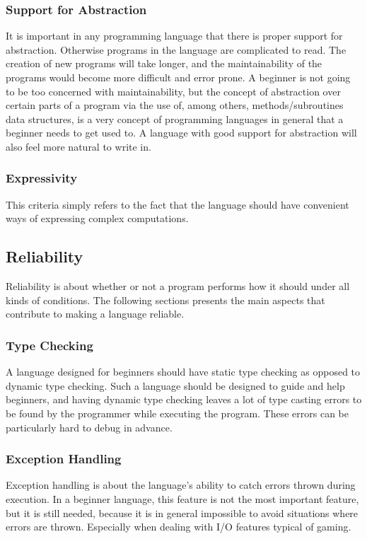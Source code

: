 \subsubsection{Support for Abstraction}
It is important in any programming language that there is proper support for abstraction. Otherwise programs in the language are complicated to read. The creation of new programs will take longer, and the maintainability of the programs would become more difficult and error prone. A beginner is not going to be too concerned with maintainability, but the concept of abstraction over certain parts of a program via the use of, among others, methods/subroutines data structures, is a very concept of programming languages in general that a beginner needs to get used to. A language with good support for abstraction will also feel more natural to write in. 
\subsubsection{Expressivity}
This criteria simply refers to the fact that the language should have convenient ways of expressing complex computations.
\subsection{Reliability}
Reliability is about whether or not a program performs how it should under all kinds of conditions. The following sections presents the main aspects that contribute to making a language reliable.
\subsubsection{Type Checking}
A language designed for beginners should have static type checking as opposed to dynamic type checking. Such a language should be designed to guide and help beginners, and having dynamic type checking leaves a lot of type casting errors to be found by the programmer while executing the program. These errors can be particularly hard to debug in advance. 
\subsubsection{Exception Handling}
Exception handling is about the language's ability to catch errors thrown during execution. In a beginner language, this feature is not the most important feature, but it is still needed, because it is in general impossible to avoid situations where errors are thrown. Especially when dealing with I/O features typical of gaming.
